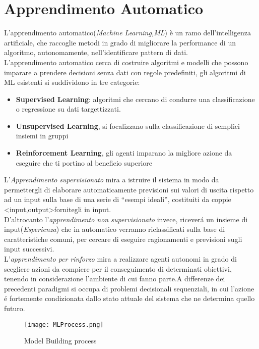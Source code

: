 \documentclass[../tesi.tex]{subfiles}
\begin{document}
\section{Apprendimento Automatico}
L’apprendimento automatico(\textit{Machine Learning,ML}) è un ramo dell’intelligenza artificiale, che raccoglie metodi in grado di migliorare la performance di un algoritmo, autonomamente, nell’identificare pattern di dati.\\
L’apprendimento automatico cerca di costruire algoritmi e modelli che possono imparare a prendere decisioni senza dati con regole predefiniti, gli algoritmi di ML esistenti si suddividono in tre categorie:
\begin{itemize}
  \item \textbf{Supervised Learning}: algoritmi che cercano di condurre una classificazione o regressione su dati targettizzati.
  \item \textbf{Unsupervised Learning}, si focalizzano sulla classificazione di semplici insiemi in gruppi 
  \item \textbf{Reinforcement Learning}, gli agenti imparano la migliore azione da eseguire che ti portino al beneficio superiore
\end{itemize}
L'\textit{Apprendimento supervisionato} mira a istruire il sistema in modo da permettergli di elaborare automaticamente previsioni sui valori di uscita rispetto ad un input sulla base di una serie di ``esempi ideali'', costituiti da coppie \textless input,output\textgreater  fornitegli in input.\\
D'altrocanto l'\textit{apprendimento non supervisionato} invece, riceverá un insieme di input(\textit{Esperienza}) che in automatico verranno riclassificati sulla base di caratteristiche comuni, per cercare di eseguire ragionamenti e previsioni sugli input successivi.\\
L'\textit{apprendimento per rinforzo} mira a realizzare agenti autonomi in grado di scegliere azioni da compiere per il conseguimento di determinati obiettivi, tenendo in considerazione l'ambiente di cui fanno parte.A differenze dei precedenti paradigmi si occupa di problemi decisionali sequenziali, in cui l'azione é fortemente condizionata dallo stato attuale del sistema che ne determina quello futuro.

\begin{figure}[htbp]
  \centering
  \texttt{[image: MLProcess.png]}
  \caption{Model Building process} 
  \end{figure}
\end{document}

